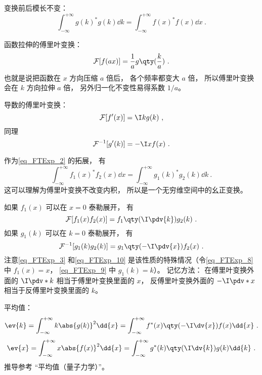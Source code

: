 变换前后模长不变：
\begin{equation}\label{eq_FTExp_2}
\int_{-\infty}^{+\infty} g(k)^* g(k) \dd{k} = \int_{-\infty}^{+\infty} f(x)^* f(x) \dd{x}~.
\end{equation}

函数拉伸的傅里叶变换：
\begin{equation}
\mathcal F[f(ax)] = \frac{1}{a} g\qty(\frac{k}{a})~.
\end{equation}
也就是说把函数在 $x$ 方向压缩 $a$ 倍后， 各个频率都变大 $a$ 倍， 所以傅里叶变换会在 $k$ 方向拉伸 $a$ 倍， 另外归一化不变性易得系数 $1/a$。

导数的傅里叶变换：
\begin{equation}\label{eq_FTExp_3}
\mathcal F [f'(x)] = \I k g(k)~,
\end{equation}
同理
\begin{equation}\label{eq_FTExp_10}
\mathcal F^{-1} [g'(k)] = -\I x f(x)~.
\end{equation}

作为\autoref{eq_FTExp_2} 的拓展， 有
\begin{equation}
\int_{-\infty}^{+\infty} f_1(x)^* f_2(x) \dd{x} = \int_{-\infty}^{+\infty} g_1(k)^* g_2(k) \dd{k}~.
\end{equation}
这可以理解为傅里叶变换不改变内积， 所以是一个无穷维空间中的幺正变换。

如果 $f_1(x)$ 可以在 $x = 0$ 泰勒展开， 有
\begin{equation}\label{eq_FTExp_8}
\mathcal{F}[f_1(x) f_2(x)] = f_1\qty(\I \pdv{k}) g_2(k)~.
\end{equation}
如果 $g_1(k)$ 可以在 $k = 0$ 泰勒展开， 有
\begin{equation}\label{eq_FTExp_9}
\mathcal{F}^{-1}[g_1(k) g_2(k)] = g_1\qty(-\I \pdv{x}) f_2(x)~.
\end{equation}
注意\autoref{eq_FTExp_3} 和\autoref{eq_FTExp_10} 是该性质的特殊情况（令\autoref{eq_FTExp_8} 中 $f_1(x) = x$， \autoref{eq_FTExp_9} 中 $g_1(k) = k$）。 记忆方法： 在傅里叶变换外面的 $\I\pdv*{k}$ 相当于傅里叶变换里面的 $x$， 反傅里叶变换外面的 $-\I\pdv*{x}$ 相当于反傅里叶变换里面的 $k$。

平均值：
\begin{equation}
\ev{k} = \int_{-\infty}^{+\infty} k\abs{g(k)}^2 \dd{x} = \int_{-\infty}^{+\infty} f^*(x)\qty(-\I \dv{x}) f(x) \dd{x}~.
\end{equation}
\begin{equation}
\ev{x} = \int_{-\infty}^{+\infty} x\abs{f(x)}^2 \dd{x} = \int_{-\infty}^{+\infty} g^*(k)\qty(\I \dv{k}) g(k) \dd{k}~.
\end{equation}
推导参考 “平均值（量子力学）”。

